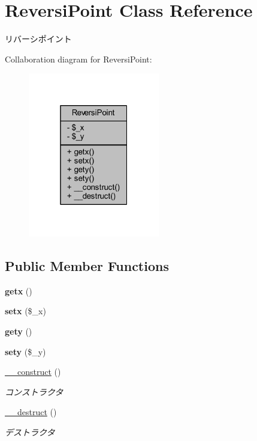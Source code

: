 \hypertarget{class_reversi_point}{}\section{Reversi\+Point Class Reference}
\label{class_reversi_point}


リバーシポイント  




Collaboration diagram for Reversi\+Point\+:
\nopagebreak
\begin{figure}[H]
\begin{center}
\leavevmode
\includegraphics[width=163pt]{class_reversi_point__coll__graph}
\end{center}
\end{figure}
\subsection*{Public Member Functions}
\begin{DoxyCompactItemize}
\item 
\mbox{\label{class_reversi_point_a3088fbd713750a579d57f35c4372c9e0}} 
{\bfseries getx} ()
\item 
\mbox{\label{class_reversi_point_a28b8a91d77413e6d64138b9b4c75f365}} 
{\bfseries setx} (\$\+\_\+x)
\item 
\mbox{\label{class_reversi_point_a537d0279caa8c09e7923ca93388c0371}} 
{\bfseries gety} ()
\item 
\mbox{\label{class_reversi_point_a2d6987f9f9cb43c74fabe08c6117ba9e}} 
{\bfseries sety} (\$\+\_\+y)
\item 
\hyperlink{class_reversi_point_a095c5d389db211932136b53f25f39685}{\+\_\+\+\_\+construct} ()
\begin{DoxyCompactList}\small\item\em コンストラクタ \end{DoxyCompactList}\item 
\hyperlink{class_reversi_point_a421831a265621325e1fdd19aace0c758}{\+\_\+\+\_\+destruct} ()
\begin{DoxyCompactList}\small\item\em デストラクタ \end{DoxyCompactList}\end{DoxyCompactItemize}
